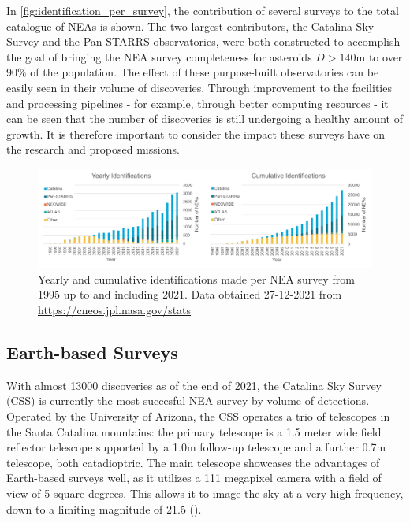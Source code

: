 In \autoref{fig:identification_per_survey}, the contribution of several surveys to the total catalogue of NEAs is shown. The two largest contributors, the Catalina Sky Survey and the Pan-STARRS observatories, were both constructed to accomplish the goal of bringing the NEA survey completeness for asteroids $D > 140 \mathrm{m}$ to over 90\% of the population. The effect of these purpose-built observatories can be easily seen in their volume of discoveries. Through improvement to the facilities and processing pipelines - for example, through better computing resources - it can be seen that the number of discoveries is still undergoing a healthy amount of growth. It is therefore important to consider the impact these surveys have on the research and proposed missions.

\begin{figure}[htbp]
 \centering
 \includegraphics[width=1.0\textwidth]{img/identification_per_survey.pdf}
 \caption{Yearly and cumulative identifications made per NEA survey from 1995 up to and including 2021. Data obtained 27-12-2021 from \url{https://cneos.jpl.nasa.gov/stats}}
 \label{fig:identification_per_survey}
\end{figure}


\subsection{Earth-based Surveys}
With almost 13000 discoveries as of the end of 2021, the Catalina Sky Survey (CSS) is currently the most succesful NEA survey by volume of detections. Operated by the University of Arizona, the CSS operates a trio of telescopes in the Santa Catalina mountains: the primary telescope is a 1.5 meter wide field reflector telescope supported by a 1.0m follow-up telescope and a further 0.7m telescope, both catadioptric. The main telescope showcases the advantages of Earth-based surveys well, as it utilizes a 111 megapixel camera with a field of view of 5 square degrees. This allows it to image the sky at a very high frequency, down to a limiting magnitude of 21.5 (\cite{CatalinaSkySurvey}).\\

